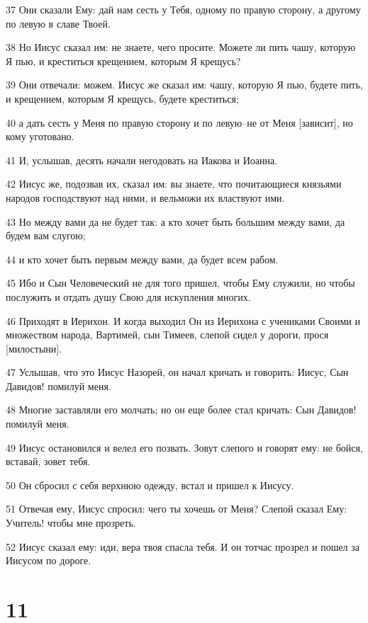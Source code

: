 \par 37 Они сказали Ему: дай нам сесть у Тебя, одному по правую сторону, а другому по левую в славе Твоей.
\par 38 Но Иисус сказал им: не знаете, чего просите. Можете ли пить чашу, которую Я пью, и креститься крещением, которым Я крещусь?
\par 39 Они отвечали: можем. Иисус же сказал им: чашу, которую Я пью, будете пить, и крещением, которым Я крещусь, будете креститься;
\par 40 а дать сесть у Меня по правую сторону и по левую--не от Меня [зависит], но кому уготовано.
\par 41 И, услышав, десять начали негодовать на Иакова и Иоанна.
\par 42 Иисус же, подозвав их, сказал им: вы знаете, что почитающиеся князьями народов господствуют над ними, и вельможи их властвуют ими.
\par 43 Но между вами да не будет так: а кто хочет быть большим между вами, да будем вам слугою;
\par 44 и кто хочет быть первым между вами, да будет всем рабом.
\par 45 Ибо и Сын Человеческий не для того пришел, чтобы Ему служили, но чтобы послужить и отдать душу Свою для искупления многих.
\par 46 Приходят в Иерихон. И когда выходил Он из Иерихона с учениками Своими и множеством народа, Вартимей, сын Тимеев, слепой сидел у дороги, прося [милостыни].
\par 47 Услышав, что это Иисус Назорей, он начал кричать и говорить: Иисус, Сын Давидов! помилуй меня.
\par 48 Многие заставляли его молчать; но он еще более стал кричать: Сын Давидов! помилуй меня.
\par 49 Иисус остановился и велел его позвать. Зовут слепого и говорят ему: не бойся, вставай, зовет тебя.
\par 50 Он сбросил с себя верхнюю одежду, встал и пришел к Иисусу.
\par 51 Отвечая ему, Иисус спросил: чего ты хочешь от Меня? Слепой сказал Ему: Учитель! чтобы мне прозреть.
\par 52 Иисус сказал ему: иди, вера твоя спасла тебя. И он тотчас прозрел и пошел за Иисусом по дороге.

\chapter{11}


